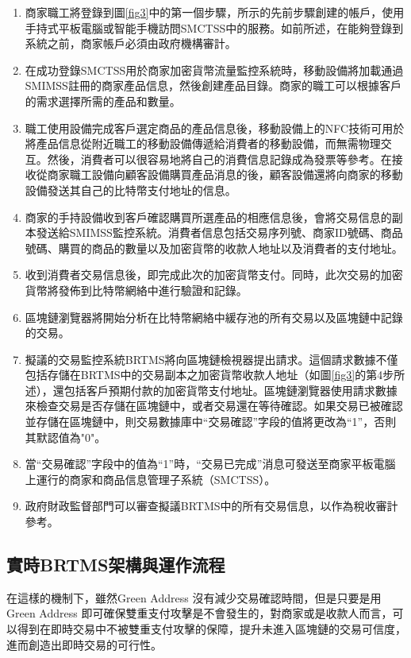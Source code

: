 		\begin{enumerate}
			\item 商家職工將登錄到圖\ref{fig3}中的第一個步驟，所示的先前步驟創建的帳戶，使用手持式平板電腦或智能手機訪問SMCTSS中的服務。如前所述，在能夠登錄到系統之前，商家帳戶必須由政府機構審計。
			\item 在成功登錄SMCTSS用於商家加密貨幣流量監控系統時，移動設備將加載通過SMIMSS註冊的商家產品信息，然後創建產品目錄。商家的職工可以根據客戶的需求選擇所需的產品和數量。

			\item 職工使用設備完成客戶選定商品的產品信息後，移動設備上的NFC技術可用於將產品信息從附近職工的移動設備傳遞給消費者的移動設備，而無需物理交互。然後，消費者可以很容易地將自己的消費信息記錄成為發票等參考。在接收從商家職工設備向顧客設備購買產品消息的後，顧客設備還將向商家的移動設備發送其自己的比特幣支付地址的信息。
			\item 商家的手持設備收到客戶確認購買所選產品的相應信息後，會將交易信息的副本發送給SMIMSS監控系統。消費者信息包括交易序列號、商家ID號碼、商品號碼、購買的商品的數量以及加密貨幣的收款人地址以及消費者的支付地址。
			\item 收到消費者交易信息後，即完成此次的加密貨幣支付。同時，此次交易的加密貨幣將發佈到比特幣網絡中進行驗證和記錄。
			\item 區塊鏈瀏覽器將開始分析在比特幣網絡中緩存池的所有交易以及區塊鏈中記錄的交易。
			\item 擬議的交易監控系統BRTMS將向區塊鏈檢視器提出請求。這個請求數據不僅包括存儲在BRTMS中的交易副本之加密貨幣收款人地址（如圖\ref{fig3}的第4步所述），還包括客戶預期付款的加密貨幣支付地址。區塊鏈瀏覽器使用請求數據來檢查交易是否存儲在區塊鏈中，或者交易還在等待確認。如果交易已被確認並存儲在區塊鏈中，則交易數據庫中“交易確認”字段的值將更改為“1”，否則其默認值為"0"。
			\item 當“交易確認”字段中的值為“1”時，“交易已完成”消息可發送至商家平板電腦上運行的商家和商品信息管理子系統（SMCTSS）。
			\item 政府財政監督部門可以審查擬議BRTMS中的所有交易信息，以作為稅收審計參考。
		\end{enumerate}

		\subsection{實時BRTMS架構與運作流程}

		在這樣的機制下，雖然Green Address 沒有減少交易確認時間，但是只要是用Green Address 即可確保雙重支付攻擊是不會發生的，對商家或是收款人而言，可以得到在即時交易中不被雙重支付攻擊的保障，提升未進入區塊鏈的交易可信度，進而創造出即時交易的可行性。 

